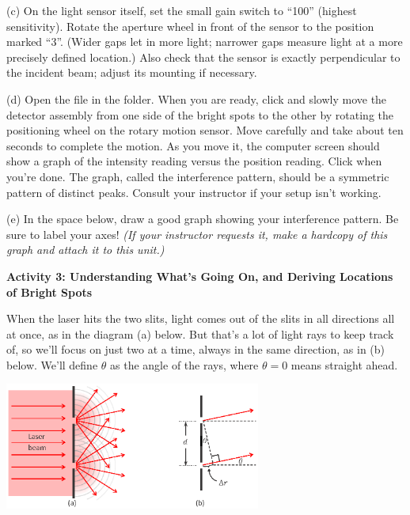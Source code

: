 
(c) On the light sensor itself, set the small gain switch to ``100'' (highest sensitivity).  Rotate the aperture wheel in front of the sensor to the position marked ``3''.  (Wider gaps let in more light; narrower gaps measure light at a more precisely defined location.)  Also check that the sensor is exactly perpendicular to the incident beam; adjust its mounting if necessary.


(d) Open the file  in the \filename{\coursefolder} folder. 
When you are ready, click  and slowly move the detector assembly 
from one side of the bright spots to the other by rotating the positioning wheel on the rotary 
motion sensor. Move carefully and take about ten seconds to complete the 
motion. 
As you move it, the computer screen should show a graph of the intensity reading versus the position reading. 
Click  when you're done. 
The graph, called the interference pattern, should be a symmetric pattern of distinct peaks. Consult your instructor if your setup isn't working.

(e) In the space below, draw a good graph showing your interference pattern.  
Be sure to label your axes!
\textit{(If your instructor requests it, make a hardcopy of this graph and attach it to this unit.)}

\answerspace{1.0in}


\pagebreak[2]
\textbf{Activity 3: Understanding What's Going On, and Deriving Locations of Bright Spots}

When the laser hits the two slits, 
light comes out of the slits in all directions all at once, as in the diagram (a) below.  
But that's a lot of light rays to keep track of, so we'll focus on just two at a time, always in the same direction, as in (b) below.
We'll define $\theta$ as the angle of the rays, where $\theta=0$ means straight ahead.  

{\centering \includegraphics[width=0.63\textwidth]{interference_of_light/rays2_color.eps} \par}

